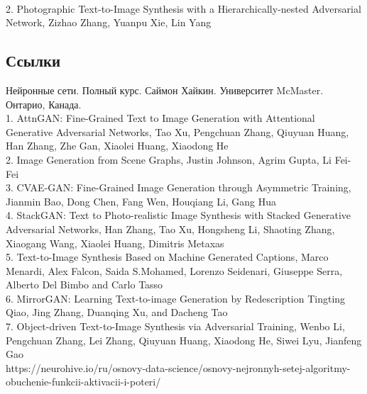 \documentclass{article}
\begin{document}
\\
        2. Photographic Text-to-Image Synthesis with a Hierarchically-nested Adversarial Network, Zizhao Zhang, Yuanpu Xie, Lin Yang\\
\newpage
    \begin{center} 
    \section{Ссылки}
    \end{center} 
      \large 
      Нейронные сети. Полный курс. Саймон Хайкин. Университет McMaster. Онтарио, Канада. \\
      1. AttnGAN: Fine-Grained Text to Image Generation
with Attentional Generative Adversarial Networks,
      Tao Xu, Pengchuan Zhang, Qiuyuan Huang, Han Zhang, Zhe Gan, Xiaolei Huang, Xiaodong He\\
      2. Image Generation from Scene Graphs,
      Justin Johnson, Agrim Gupta, Li Fei-Fei\\
      3. CVAE-GAN: Fine-Grained Image Generation through Asymmetric Training, Jianmin Bao, Dong Chen, Fang Wen, Houqiang Li, Gang Hua\\
      4. StackGAN: Text to Photo-realistic Image Synthesis with Stacked Generative Adversarial Networks, Han Zhang, Tao Xu, Hongsheng Li, Shaoting Zhang, Xiaogang Wang, Xiaolei Huang, Dimitris Metaxas\\
      5. Text-to-Image Synthesis Based on Machine Generated Captions, Marco Menardi, Alex Falcon, Saida S.Mohamed, Lorenzo Seidenari, Giuseppe Serra, Alberto Del Bimbo and Carlo Tasso\\
      6. MirrorGAN: Learning Text-to-image Generation by Redescription Tingting Qiao, Jing Zhang, Duanqing Xu, and Dacheng Tao\\
      7. Object-driven Text-to-Image Synthesis via Adversarial Training, Wenbo Li, Pengchuan Zhang, Lei Zhang, Qiuyuan Huang, Xiaodong He, Siwei Lyu, Jianfeng Gao\\
      https://neurohive.io/ru/osnovy-data-science/osnovy-nejronnyh-setej-algoritmy-obuchenie-funkcii-aktivacii-i-poteri/ \\
      \\
      \\
      \\
      \\
      \\
      
\end{document}

